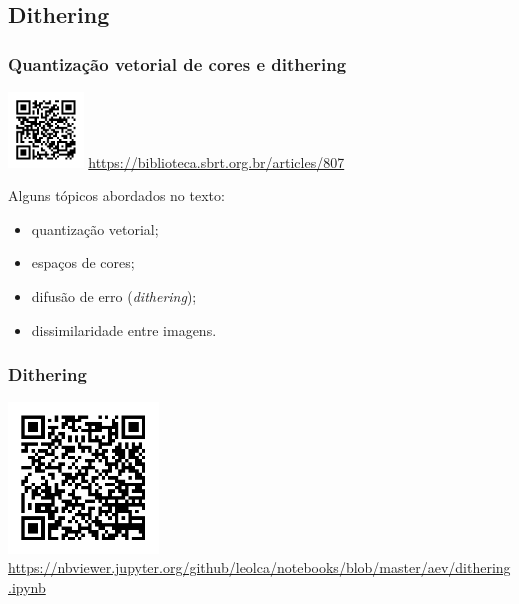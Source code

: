 \subsection{Dithering}

\begin{frame}%
  \frametitle{Quantização vetorial de cores e dithering}


  {
  \raggedleft
  \includegraphics[width=0.15\textwidth]{images/qrcode-artigo-dithering.pdf}
  \url{https://biblioteca.sbrt.org.br/articles/807}
  }
  
  Alguns tópicos abordados no texto:
  \begin{itemize}
  \item quantização vetorial;
  \item espaços de cores;
  \item difusão de erro (\textit{dithering});
  \item dissimilaridade entre imagens.
  \end{itemize}
 
\end{frame}

\begin{frame}%
  \frametitle{Dithering}

  \centering
  \includegraphics[width=0.3\textwidth]{images/qrcode-jupyter-dithering.pdf}
  \url{https://nbviewer.jupyter.org/github/leolca/notebooks/blob/master/aev/dithering.ipynb}

\end{frame}

